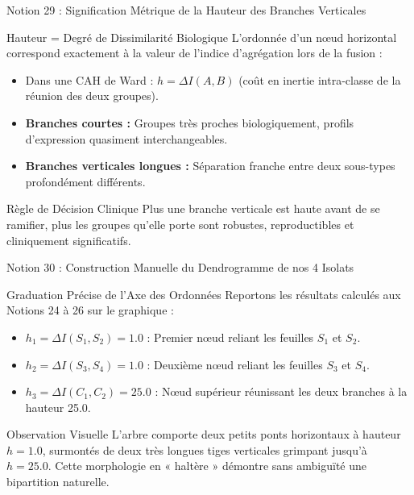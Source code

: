 \documentclass[aspectratio=169,10pt]{beamer}
\begin{document}
\begin{frame}{Notion 29 : Signification Métrique de la Hauteur des Branches Verticales}
  \begin{conceptbox}{Hauteur = Degré de Dissimilarité Biologique}
    \footnotesize
    L'ordonnée d'un nœud horizontal correspond exactement à la valeur de l'indice d'agrégation lors de la fusion :
    \begin{itemize}
      \item Dans une CAH de Ward : $h = \Delta I(A, B)$ (coût en inertie intra-classe de la réunion des deux groupes).
      \item \textbf{Branches courtes :} Groupes très proches biologiquement, profils d'expression quasiment interchangeables.
      \item \textbf{Branches verticales longues :} Séparation franche entre deux sous-types profondément différents.
    \end{itemize}
  \end{conceptbox}
  \vspace{1mm}
  \begin{biobox}{Règle de Décision Clinique}
    \footnotesize
    Plus une branche verticale est haute avant de se ramifier, plus les groupes qu'elle porte sont robustes, reproductibles et cliniquement significatifs.
  \end{biobox}
\end{frame}

\begin{frame}{Notion 30 : Construction Manuelle du Dendrogramme de nos 4 Isolats}
  \begin{conceptbox}{Graduation Précise de l'Axe des Ordonnées}
    \footnotesize
    Reportons les résultats calculés aux Notions 24 à 26 sur le graphique :
    \begin{itemize}
      \item $h_1 = \Delta I(S_1, S_2) = \mathbf{1.0}$ : Premier nœud reliant les feuilles $S_1$ et $S_2$.
      \item $h_2 = \Delta I(S_3, S_4) = \mathbf{1.0}$ : Deuxième nœud reliant les feuilles $S_3$ et $S_4$.
      \item $h_3 = \Delta I(C_1, C_2) = \mathbf{25.0}$ : Nœud supérieur réunissant les deux branches à la hauteur 25.0.
    \end{itemize}
  \end{conceptbox}
  \vspace{1mm}
  \begin{takeawaybox}{Observation Visuelle}
    \footnotesize
    L'arbre comporte deux petits ponts horizontaux à hauteur $h = 1.0$, surmontés de deux très longues tiges verticales grimpant jusqu'à $h = 25.0$. Cette morphologie en « haltère » démontre sans ambiguïté une bipartition naturelle.
  \end{takeawaybox}
\end{frame}
\end{document}
